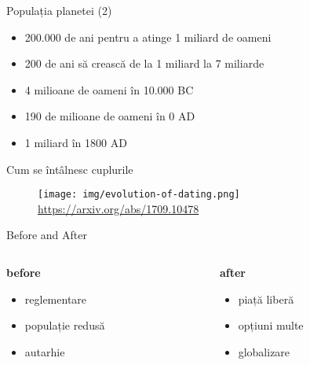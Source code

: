 \documentclass{simple}
\begin{document}
\begin{frame}{Populația planetei (2)}
  \begin{itemize}
    \pause
    \item 200.000 de ani pentru a atinge 1 miliard de oameni
    \pause
    \item 200 de ani să crească de la 1 miliard la 7 miliarde
    \pause
    \item 4 milioane de oameni în 10.000 BC
    \pause
    \item 190 de milioane de oameni în 0 AD
    \pause
    \item 1 miliard în 1800 AD
  \end{itemize}
\end{frame}

\begin{frame}{Cum se întâlnesc cuplurile}
  \begin{figure}[!htbp]
    \centering
    \texttt{[image: img/evolution-of-dating.png]} \\
    \tiny{\url{https://arxiv.org/abs/1709.10478}}
  \end{figure}
\end{frame}

\begin{frame}{Before and After}
  \begin{columns}
    \begin{column}{0.5\textwidth}
      \textbf{before}
        \begin{itemize}
          \scriptsize
          \pause
          \item reglementare
          \pause
          \item populație redusă
          \pause
          \item autarhie
        \end{itemize}
    \end{column}
    \begin{column}{0.5\textwidth}
      \textbf{after}
        \begin{itemize}
          \scriptsize
          \pause
          \item piață liberă
          \pause
          \item opțiuni multe
          \pause
          \item globalizare
        \end{itemize}
    \end{column}
  \end{columns}
\end{frame}
\end{document}
